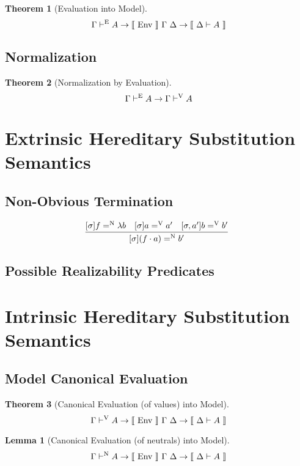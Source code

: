 \documentclass[preprint,nonatbib]{sigplanconf}
\numberwithin{subdefin}{defin}
\newtheorem{theorem}{Theorem}
\newtheorem{subtheorem}{Lemma}
\numberwithin{subtheorem}{theorem}
\def\marr{\rightarrow}
\def\app{\cdot}
\def\lam{\lambda}
\newcommand{\turn}[1]{\vdash^\con{#1}}
\newcommand{\hsubn}[2]{[\sigma]#1=^\con{N}#2}
\newcommand{\hsub}[2]{[\sigma]#1=^\con{V}#2}
\newcommand{\hsubext}[3]{[\sigma, #1]#2=^\con{V}#3}
\newcommand{\el}[1]{\llbracket ~ #1 ~ \rrbracket}
\newcommand{\con}[1]{\textmd{#1}}
\newcommand{\fun}[1]{\textmd{#1}}
\newcommand{\dtypm}[1]{\el{\Delta \vdash #1}}
\newcommand{\type}[1]{\Gamma \turn{E} #1}
\newcommand{\typv}[1]{\Gamma \turn{V} #1}
\newcommand{\typn}[1]{\Gamma \turn{N} #1}
\def\menv{\el{\fun{Env}}~\Gamma~\Delta}
\begin{document}
\begin{theorem}[Evaluation into Model]
\label{thm:mod:eval}
$$
\type{A} \marr \menv \marr \dtypm{A}
$$
\end{theorem}

\subsection{Normalization}

\begin{theorem}[Normalization by Evaluation]
\label{thm:mod:enorm}
$$
\type{A} \marr \typv{A}
$$
\end{theorem}

\section{Extrinsic Hereditary Substitution Semantics}
\label{sec:vpred}

\subsection{Non-Obvious Termination}

$$
\infer
  []{\hsubn{(f \app a)}{b'}}
{
  \hsubn{f}{\lam b}
  &
  \hsub{a}{a'}
  &
  \hsubext{a'}{b}{b'}
}
$$

\subsection{Possible Realizability Predicates}

\section{Intrinsic Hereditary Substitution Semantics}
\label{sec:vmod}

\subsection{Model Canonical Evaluation}

\begin{theorem}[Canonical Evaluation (of values) into Model]
\label{thm:mod:veval}
$$
\typv{A} \marr \menv \marr \dtypm{A}
$$
\end{theorem}

\begin{subtheorem}[Canonical Evaluation (of neutrals) into Model]
\label{thm:mod:neval}
$$
\typn{A} \marr \menv \marr \dtypm{A}
$$
\end{subtheorem}
\end{document}
